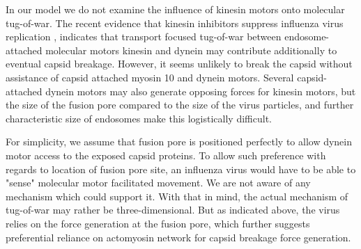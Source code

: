 In our model we do not examine the influence of kinesin motors onto molecular tug-of-war. The recent evidence that kinesin inhibitors suppress influenza virus replication \cite{cho2020selective, kim2021kif11}, indicates that transport focused tug-of-war between endosome-attached molecular motors kinesin and dynein may contribute additionally to eventual capsid breakage. However, it seems unlikely to break the capsid  without assistance of capsid attached myosin 10 and dynein motors. Several capsid-attached dynein motors may also generate opposing forces for kinesin motors, but the size of the fusion pore \cite{lee2010architecture} compared to the size of the virus particles, and further characteristic size of endosomes \cite{ganley2004rab9} make this logistically difficult.

For simplicity, we assume that fusion pore is positioned perfectly to allow dynein motor access to the exposed capsid proteins. To allow such preference with regards to location of fusion pore site, an influenza virus would have to be able to "sense" molecular motor facilitated movement. We are not aware of any mechanism which could support it. With that in mind, the actual mechanism of tug-of-war may rather be three-dimensional. But as indicated above, the virus relies on the force generation at the fusion pore, which further suggests preferential reliance on actomyosin network for capsid breakage force generation.
